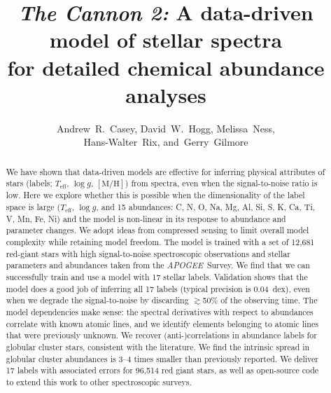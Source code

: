 \documentclass[12pt,preprint]{aastex}
\newcommand{\project}[1]{\textsl{#1}}
\newcommand{\acronym}[1]{{\small{#1}}}
\newcommand{\apogee}{\project{\acronym{APOGEE}}}
\newcommand{\logg}{\log g}
\newcommand{\mh}{\mathrm{[M/H]}}
\newcommand{\Teff}{T_{\mathrm{eff}}}
\begin{document}
\title{\textsl{The Cannon 2:} A data-driven model of stellar spectra \\
       for detailed chemical abundance analyses}
\author{Andrew~R.~Casey,
        David~W.~Hogg,
        Melissa~Ness,\\
        Hans-Walter~Rix,
    and~Gerry~Gilmore}


\begin{abstract}
We have shown that data-driven models are effective for inferring physical 
attributes of stars (labels; $\Teff$, $\logg$, $\mh$) from spectra, even when
the signal-to-noise ratio is low.
Here we explore whether this is possible when the dimensionality of the label
space is large ($\Teff$, $\logg$, and 15 abundances: C, N, O, Na, Mg, Al, Si, S, 
K, Ca, Ti, V, Mn, Fe, Ni) and the model is non-linear in its response to 
abundance and parameter changes.
We adopt ideas from compressed sensing to limit overall model complexity
while retaining model freedom.  The model is trained
with a set of 12,681 red-giant stars with high signal-to-noise spectroscopic 
observations and stellar parameters and abundances taken from the \apogee\ 
Survey.
We find that we can successfully train and use a model with 17 stellar labels.
Validation shows that the model does a good job of inferring all 17 labels 
(typical precision is 0.04~dex), even when we degrade the signal-to-noise by 
discarding $\gtrsim$50\% of the observing time. The model dependencies 
make sense: the spectral derivatives with respect to abundances correlate
with known atomic lines, and we identify elements belonging
to atomic lines that were previously unknown.  We recover (anti-)correlations
in abundance labels for globular cluster stars, consistent with the literature.
We find the intrinsic spread in globular cluster abundances is 3--4 times smaller than 
previously reported.  We deliver 17 labels with associated errors for 
96,514 red giant stars, as well as open-source code to extend this work to other spectroscopic surveys.
\end{abstract}
\end{document}

